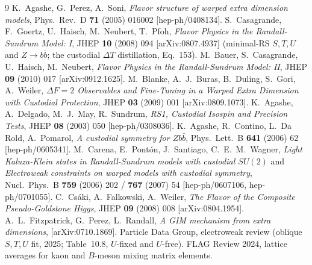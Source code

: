 \documentclass[11pt]{article}
\begin{document}
\begin{thebibliography}{9}
\small
{} K.~Agashe, G.~Perez, A.~Soni, \emph{Flavor structure of warped extra
dimension models}, Phys.\ Rev.\ D \textbf{71} (2005) 016002 [hep-ph/0408134].
 S.~Casagrande, F.~Goertz, U.~Haisch, M.~Neubert, T.~Pfoh,
\emph{Flavor Physics in the Randall-Sundrum Model: I}, JHEP \textbf{10} (2008) 094
[arXiv:0807.4937] (minimal-RS $S,T,U$ and $Z\to b\bar b$; the custodial $\Delta T$
distillation, Eq.~153).
 M.~Bauer, S.~Casagrande, U.~Haisch, M.~Neubert, \emph{Flavor Physics
in the Randall-Sundrum Model: II}, JHEP \textbf{09} (2010) 017 [arXiv:0912.1625].
 M.~Blanke, A.~J.~Buras, B.~Duling, S.~Gori, A.~Weiler,
\emph{$\Delta F=2$ Observables and Fine-Tuning in a Warped Extra Dimension with
Custodial Protection}, JHEP \textbf{03} (2009) 001 [arXiv:0809.1073].
 K.~Agashe, A.~Delgado, M.~J.~May, R.~Sundrum, \emph{RS1, Custodial
Isospin and Precision Tests}, JHEP \textbf{08} (2003) 050 [hep-ph/0308036].
 K.~Agashe, R.~Contino, L.~Da Rold, A.~Pomarol, \emph{A custodial
symmetry for $Z b\bar b$}, Phys.\ Lett.\ B \textbf{641} (2006) 62 [hep-ph/0605341].
 M.~Carena, E.~Pont\'on, J.~Santiago, C.~E.~M.~Wagner, \emph{Light
Kaluza-Klein states in Randall-Sundrum models with custodial $SU(2)$} and
\emph{Electroweak constraints on warped models with custodial symmetry},
Nucl.\ Phys.\ B \textbf{759} (2006) 202 / \textbf{767} (2007) 54 [hep-ph/0607106,
hep-ph/0701055].
 C.~Cs\'aki, A.~Falkowski, A.~Weiler, \emph{The Flavor of the Composite
Pseudo-Goldstone Higgs}, JHEP \textbf{09} (2008) 008 [arXiv:0804.1954].
 A.~L.~Fitzpatrick, G.~Perez, L.~Randall, \emph{A GIM mechanism from
extra dimensions}, [arXiv:0710.1869].
 Particle Data Group, electroweak review (oblique $S,T,U$ fit,
2025; Table~10.8, $U$-fixed and $U$-free).
 FLAG Review 2024, lattice averages for kaon and $B$-meson mixing
matrix elements.
\end{thebibliography}
\end{document}
